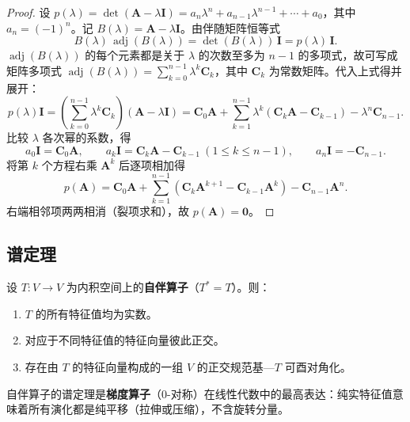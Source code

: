 \begin{proof}
设 $p(\lambda) = \det(\mathbf{A}-\lambda\mathbf{I}) = a_n\lambda^n + a_{n-1}\lambda^{n-1} + \cdots + a_0$，其中 $a_n = (-1)^n$。记 $B(\lambda) = \mathbf{A}-\lambda\mathbf{I}$。由伴随矩阵恒等式
\[
B(\lambda)\,\operatorname{adj}(B(\lambda)) = \det(B(\lambda))\,\mathbf{I} = p(\lambda)\,\mathbf{I}.
\]
$\operatorname{adj}(B(\lambda))$ 的每个元素都是关于 $\lambda$ 的次数至多为 $n-1$ 的多项式，故可写成矩阵多项式 $\operatorname{adj}(B(\lambda)) = \sum_{k=0}^{n-1}\lambda^k\mathbf{C}_k$，其中 $\mathbf{C}_k$ 为常数矩阵。代入上式得并展开：
\[
p(\lambda)\mathbf{I} = \left(\sum_{k=0}^{n-1}\lambda^k\mathbf{C}_k\right)(\mathbf{A}-\lambda\mathbf{I})
= \mathbf{C}_0\mathbf{A} + \sum_{k=1}^{n-1}\lambda^k(\mathbf{C}_k\mathbf{A}-\mathbf{C}_{k-1}) - \lambda^n\mathbf{C}_{n-1}.
\]
比较 $\lambda$ 各次幂的系数，得
\[
a_0\mathbf{I} = \mathbf{C}_0\mathbf{A},\qquad a_k\mathbf{I} = \mathbf{C}_k\mathbf{A}-\mathbf{C}_{k-1}\ (1\le k\le n-1),\qquad a_n\mathbf{I} = -\mathbf{C}_{n-1}.
\]
将第 $k$ 个方程右乘 $\mathbf{A}^k$ 后逐项相加得
\[
p(\mathbf{A}) = \mathbf{C}_0\mathbf{A} + \sum_{k=1}^{n-1}(\mathbf{C}_k\mathbf{A}^{k+1}-\mathbf{C}_{k-1}\mathbf{A}^k) - \mathbf{C}_{n-1}\mathbf{A}^n.
\]
右端相邻项两两相消（裂项求和），故 $p(\mathbf{A}) = \mathbf{0}$。
\end{proof}

\subsection{\texorpdfstring{谱定理}{谱定理}}

\begin{theorem}\label{thm:spectral_theorem_selfadjoint}
设 $T: V \to V$ 为内积空间上的\textbf{自伴算子}（$T^* = T$）。则：
\begin{enumerate}[label=(\roman*)]
    \item $T$ 的所有特征值均为实数。
    \item 对应于不同特征值的特征向量彼此正交。
    \item 存在由 $T$ 的特征向量构成的一组 $V$ 的正交规范基---$T$ 可酉对角化。
\end{enumerate}
自伴算子的谱定理是\textbf{梯度算子}（$0$-对称）在线性代数中的最高表达：纯实特征值意味着所有演化都是纯平移（拉伸或压缩），不含旋转分量。
\end{theorem}

